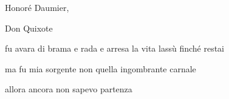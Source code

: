 \clearpage


\begin{artItem}
	Honoré Daumier, \begin{otherlanguage}{spanish}%
		Don Quixote%
	\end{otherlanguage}
\end{artItem}

\begin{poem}
	\begin{stanza}
		fu avara di brama\verseline
		e rada e arresa\verseline
		la vita lassù\verseline
		finché restai
	\end{stanza}

	\begin{stanza}
		ma fu mia sorgente\verseline
		non quella ingombrante\verseline
		carnale
	\end{stanza}

	\begin{stanza}
		allora ancora non sapevo\verseline
		partenza
	\end{stanza}
\end{poem}
